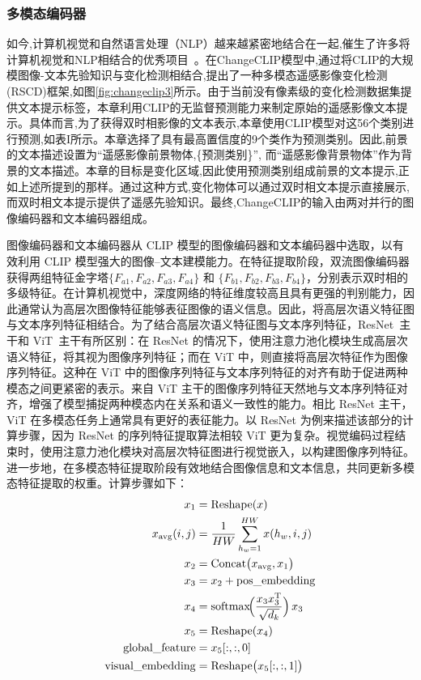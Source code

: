 \subsubsection{多模态编码器}
如今,计算机视觉和自然语言处理（NLP）越来越紧密地结合在一起,催生了许多将计算机视觉和NLP相结合的优秀项目~\cite{Chen2021VisualGPTDA, Lu2019ViLBERTPT}。在ChangeCLIP模型中,通过将CLIP的大规模图像-文本先验知识与变化检测相结合,提出了一种多模态遥感影像变化检测(RSCD)框架,如图\ref{fig:changeclip3}所示。由于当前没有像素级的变化检测数据集提供文本提示标签，本章利用CLIP的无监督预测能力来制定原始的遥感影像文本提示。具体而言,为了获得双时相影像的文本表示,本章使用CLIP模型对这56个类别进行预测,如表I所示。本章选择了具有最高置信度的9个类作为预测类别。因此,前景的文本描述设置为``遥感影像前景物体,\{预测类别\}'', 而``遥感影像背景物体''作为背景的文本描述。本章的目标是变化区域,因此使用预测类别组成前景的文本提示,正如上述所提到的那样。通过这种方式,变化物体可以通过双时相文本提示直接展示,而双时相文本提示提供了遥感先验知识。最终,ChangeCLIP的输入由两对并行的图像编码器和文本编码器组成。

图像编码器和文本编码器从 CLIP 模型的图像编码器和文本编码器中选取，以有效利用 CLIP 模型强大的图像–文本建模能力。在特征提取阶段，双流图像编码器获得两组特征金字塔$\{F_{a1},F_{a2},F_{a3},F_{a4}\}$ 和 $\{F_{b1},F_{b2},F_{b3},F_{b4}\}$，分别表示双时相的多级特征。在计算机视觉中，深度网络的特征维度较高且具有更强的判别能力，因此通常认为高层次图像特征能够表征图像的语义信息。因此，将高层次语义特征图与文本序列特征相结合。为了结合高层次语义特征图与文本序列特征，ResNet~\cite{He2015DeepRL}主干和 ViT~\cite{Dosovitskiy2020AnII}主干有所区别：在 ResNet 的情况下，使用注意力池化模块生成高层次语义特征，将其视为图像序列特征；而在 ViT 中，则直接将高层次特征作为图像序列特征。这种在 ViT 中的图像序列特征与文本序列特征的对齐有助于促进两种模态之间更紧密的表示。来自 ViT 主干的图像序列特征天然地与文本序列特征对齐，增强了模型捕捉两种模态内在关系和语义一致性的能力。相比 ResNet 主干，ViT 在多模态任务上通常具有更好的表征能力。以 ResNet 为例来描述该部分的计算步骤，因为 ResNet 的序列特征提取算法相较 ViT 更为复杂。视觉编码过程结束时，使用注意力池化模块对高层次特征图进行视觉嵌入，以构建图像序列特征。进一步地，在多模态特征提取阶段有效地结合图像信息和文本信息，共同更新多模态特征提取的权重。计算步骤如下：
\begin{align}
x_1 &= \mathrm{Reshape}(x) \label{eq:changeclip-1}\\
x_{\mathrm{avg}}(i,j) &= \frac{1}{HW}\sum_{h_w=1}^{HW} x(h_w, i, j) \label{eq:changeclip-2}\\
x_2 &= \mathrm{Concat}\bigl(x_{\mathrm{avg}}, x_1\bigr) \label{eq:changeclip-3}\\
x_3 &= x_2 + \mathrm{pos\_embedding} \label{eq:changeclip-4}\\
x_4 &= \mathrm{softmax}\!\Bigl(\frac{x_3 x_3^{\mathrm{T}}}{\sqrt{d_k}}\Bigr)\,x_3 \label{eq:changeclip-5}\\
x_5 &= \mathrm{Reshape}(x_4) \label{eq:changeclip-6}\\
\mathrm{global\_feature} &= x_5[:,:,0] \label{eq:changeclip-7}\\
\mathrm{visual\_embedding} &= \mathrm{Reshape}\bigl(x_5[:,:,1]\bigr) \label{eq:changeclip-8}
\end{align}


